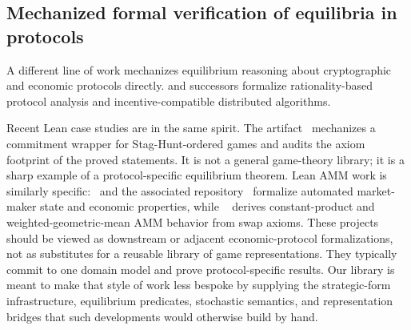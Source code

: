\subsection{Mechanized formal verification of equilibria in protocols}
\label{sec:rw:protocols}

A different line of work mechanizes
equilibrium reasoning about cryptographic and economic protocols
directly.  \citet{HalpernPass2008, AbrahamDolevGonenHalpern2006}
and successors formalize rationality-based protocol analysis and
incentive-compatible distributed algorithms.

Recent Lean case studies are in the same spirit.  The
 artifact~\citep{VerifiedHandshake2026}
mechanizes a commitment wrapper for Stag-Hunt-ordered games and
audits the axiom footprint of the proved statements.  It is not a
general game-theory library; it is a sharp example of a
protocol-specific equilibrium theorem.  Lean AMM work is similarly
specific:\ \citet{PuscedduBartoletti2024AMM} and the associated
 repository~\citep{Lean4AMM} formalize automated
market-maker state and economic properties, while
~\citep{AMMAxiomsLean2026} derives
constant-product and weighted-geometric-mean AMM behavior from swap
axioms.  These projects should be viewed as downstream or adjacent
economic-protocol formalizations, not as substitutes for a reusable
library of game representations.  They typically commit to one
domain model and prove protocol-specific results.  Our library is
meant to make that style of work less bespoke by supplying the
strategic-form infrastructure, equilibrium predicates, stochastic
semantics, and representation bridges that such developments would
otherwise build by hand.
